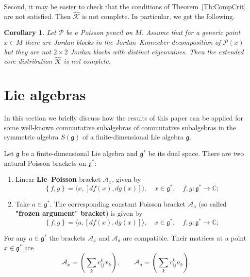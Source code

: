 \documentclass[12pt]{article}
\newtheorem{corollary}[lemma]{Corollary}
\theoremstyle{definition}
\begin{document}
Second, it may be easier to check that the conditions of Theorem~\ref{Th:CompCrit} are not satisfied. Then $\hat{\mathcal{K}}$ is not complete. In particular, we get the following.

\begin{corollary} \label{Cor:NotComp} Let $\mathcal{P}$ be a Poisson pencil on $M$. Assume that for a generic point $x \in M$ there are Jordan blocks in the Jordan--Kronecker decomposition of $\mathcal{P}(x)$ but they are not $2 \times 2$ Jordan blocks with distinct eigenvalues. Then the extended core distribution $\hat{\mathcal{K}}$ is not complete. 
\end{corollary}




\section{Lie algebras} \label{S:LieAlg}

In this section we briefly discuss how the results of this paper can be applied for some well-known commutative subalgebras of commutative subalgebras in the symmetric algebra $S(\mathfrak{g})$ of a finite-dimensional Lie algebra $\mathfrak{g}$.

Let $\mathfrak{g}$ be a finite-dimensional Lie algebra and $\mathfrak{g}^*$ be its dual space. There are two natural Poisson brackets on $\mathfrak{g}^*$:

\begin{enumerate}

    \item Linear \textbf{Lie--Poisson} bracket $\mathcal{A}_x$, given by \[ \left\{ f, g\right\} = \langle x, [df(x), dg(x) ] \rangle, \quad x \in \mathfrak{g}^*, \quad f,g:\mathfrak{g}^* \to \mathbb{C};\]


    \item Take $a \in \mathfrak{g}^*$. The corresponding constant  Poisson bracket $\mathcal{A}_a$ (so called \textbf{"frozen argument" bracket}) is given by \[ \left\{ f, g\right\} = \langle a, [df(x), dg(x) ] \rangle, \quad x \in \mathfrak{g}^*, \quad f,g:\mathfrak{g}^* \to \mathbb{C};\]
    
\end{enumerate}

For any $a \in \mathfrak{g}^*$ the brackets $\mathcal{A}_x$ and $\mathcal{A}_a$ are compatible. Their matrices at a point $x\in \mathfrak{g}^*$ are \begin{equation} \label{Eq:PencilMatLie} \mathcal{A}_x  = \left(\sum_k c_{ij}^k x_k \right), \qquad \mathcal{A}_a = \left(\sum_k c_{ij}^k a_k \right). \end{equation}
\end{document}
